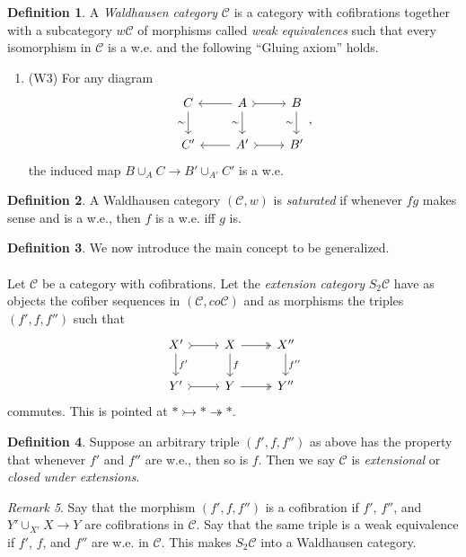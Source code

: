 \documentclass[10pt,letterpaper,cm]{nupset}
\theoremstyle{definition}
\newtheorem{definition}{Definition}
\theoremstyle{theorem}
\theoremstyle{remark}
\newtheorem{remark}[definition]{Remark}
\newcommand{\1}{\mathbf{1}}
\renewcommand{\c}{\mathscr{C}}
\newcommand{\0}{\vec 0}
\begin{document}
\begin{definition}
A \textit{Waldhausen category} $\c$ is a category with cofibrations together with a subcategory $w\c$ of morphisms called \textit{weak equivalences} such that every isomorphism in $\c$ is a w.e. and the following ``Gluing axiom'' holds.
\begin{enumerate}
\item (W3) For any diagram
\[
\begin{tikzcd}
C \arrow[d, "\sim"'] & A \arrow[d, "\sim"'] \arrow[r, tail] \arrow[l] & B \arrow[d, "\sim"'] \\
C' & A' \arrow[r, tail] \arrow[l] & B'
\end{tikzcd}, \]
the induced map $B \cup_A C \to  B' \cup_{A'} C'$ is a w.e.
\end{enumerate}
\end{definition}

\begin{definition}
A Waldhausen category $(\c, w)$ is \textit{saturated} if whenever $fg$ makes sense and is a w.e., then $f$ is a w.e. iff $g$ is. 
\end{definition}

\begin{definition}
We now introduce the main concept to be generalized.
\\ \\ Let $\c$ be a category with cofibrations. Let the \textit{extension category} $S_2\c$ have as objects the cofiber sequences in $(\c, co\c)$ and as morphisms the triples $(f', f, f'')$ such that
\[
\begin{tikzcd}
X' \arrow[r, tail] \arrow[d, "f'"] & X \arrow[r, two heads] \arrow[d, "f"] & X'' \arrow[d, "f''"] \\
Y' \arrow[r, tail] & Y \arrow[r, two heads] & Y''
\end{tikzcd}
\] 
commutes. This is pointed at $\ast \rightarrowtail \ast \twoheadrightarrow \ast$.
\end{definition}

\begin{definition}
Suppose an arbitrary triple $(f', f, f'')$ as above has the property that whenever $f'$ and $f''$ are w.e., then so is $f$. Then we say $\c$ is \textit{extensional} or \textit{closed under extensions}.
\end{definition}

\begin{remark}
Say that the morphism $(f', f, f'')$ is a cofibration if $f'$, $f''$, and $Y' \cup_{X'} X \to Y$ are cofibrations in $\c$. Say that  the same triple is a weak equivalence if $f'$, $f$, and $f''$ are w.e. in $\c$. This makes $S_2 \c$ into a Waldhausen category.
\end{remark}
\end{document}
